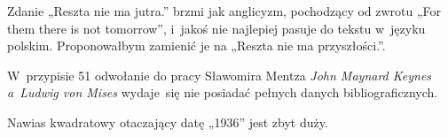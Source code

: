 \documentclass[a4paper,11pt]{article}
\begin{document}
\start {} Zdanie „Reszta nie ma jutra.” brzmi jak anglicyzm,
pochodzący od zwrotu „For them there is not tomorrow”, i~jakoś nie
najlepiej pasuje do tekstu w~języku polskim. Proponowałbym zamienić je na
„Reszta nie ma przyszłości.”.

\vspace{\spaceFour}





\start {} W~przypisie 51 odwołanie do pracy Sławomira Mentza
\textit{John Maynard Keynes a~Ludwig von Mises} wydaje~się nie posiadać
pełnych danych bibliograficznych.

\vspace{\spaceFour}




\start {} Nawias kwadratowy otaczający datę „1936” jest zbyt
duży.

\vspace{\spaceFour}










\newpage

\end{document}
